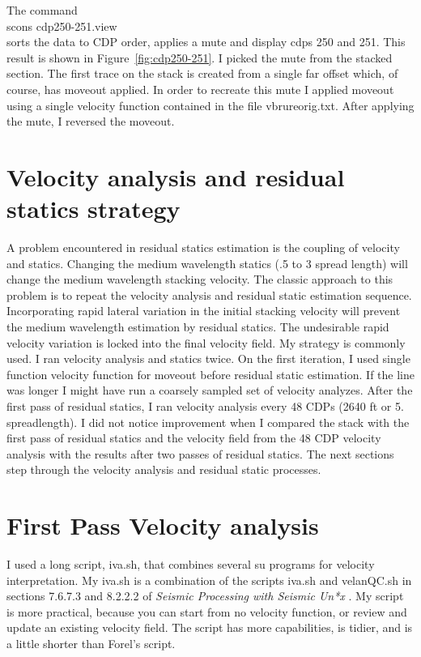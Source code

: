 The command\\
scons cdp250-251.view \\
sorts the data to CDP order, applies a mute and display cdps 250 and 
251.  This result is shown in Figure~\ref{fig:cdp250-251}.  I picked 
the mute from the stacked section.  The first trace on the stack is 
created from a single far offset which, of course, has moveout applied.  
In order to recreate this mute I applied moveout using a single velocity 
function contained in the file vbrureorig.txt. After applying the mute, 
I reversed the moveout.

\section{Velocity analysis and residual statics strategy}
A problem encountered in residual statics estimation is the coupling of 
velocity and statics.  Changing the medium wavelength statics (.5 to 3 
spread length) will change the medium wavelength stacking velocity.  
The classic approach to this problem is to repeat the velocity analysis 
and residual static estimation sequence.  Incorporating rapid lateral 
variation in the initial stacking velocity will prevent the medium wavelength 
estimation by residual statics.  The undesirable rapid velocity variation 
is locked into the final velocity field.  My strategy is 
commonly used.  I ran velocity analysis and statics twice.  On the first 
iteration, I used single function velocity function for moveout before 
residual static estimation.  If the line was longer I might have run
a coarsely sampled set of velocity analyzes. After the first 
pass of residual statics,  I ran velocity analysis every 48 CDPs (2640 ft 
or 5. spreadlength).  I did not notice improvement when I compared the 
stack with the first pass of residual statics and the velocity field from 
the 48 CDP velocity analysis with the results after two passes of residual 
statics.  The next sections step through the velocity analysis and residual 
static processes.

\section{First Pass Velocity analysis}
I used a long script, iva.sh, that combines several su programs for velocity 
interpretation.  My iva.sh is a combination of the scripts iva.sh and 
velanQC.sh in sections 7.6.7.3 and 8.2.2.2 of 
\emph{Seismic Processing with Seismic Un*x} \cite[]{forel}.  My script is 
more practical, because you can start from no velocity function, or review 
and update an existing velocity field.  The script has more capabilities, 
is tidier, and is a little shorter than Forel's script.

